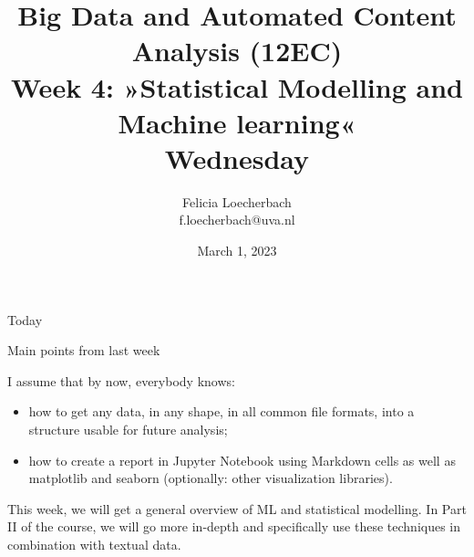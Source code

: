 \documentclass[compress]{beamer}
\begin{document}
\title[Big Data and Automated Content Analysis]{\textbf{Big Data and Automated Content Analysis (12EC)} 
\\Week 4: »Statistical Modelling and Machine learning«
\\Wednesday}
\author[Felicia Loecherbach]{Felicia Loecherbach\\ \footnotesize{f.loecherbach@uva.nl\\}}
\date{March 1, 2023}


\begin{frame}{}
	\titlepage
\end{frame}

\begin{frame}{Today}
	\tableofcontents
\end{frame}





\begin{frame}{Main points from last week}

\begin{alertblock}{I assume that by now, everybody knows:}
\begin{itemize}
\item how to get any data, in any shape, in all common file formats, into a structure usable for future analysis;
\item how to create a report in Jupyter Notebook using Markdown cells as well as matplotlib and seaborn (optionally: other visualization libraries).
\end{itemize}
\end{alertblock}
\end{frame}


\begin{frame}[standout]
This week, we will get a general overview of ML and statistical modelling. In Part II of the course, we will go more in-depth and specifically use these techniques in combination with textual data.
\end{frame}







\end{document}
